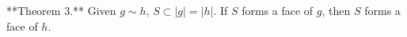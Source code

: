 **Theorem 3.** Given $g \sim h$, $S \subset |g| = |h|$. If $S$ forms a face of $g$, then $S$ forms a face of $h$.
